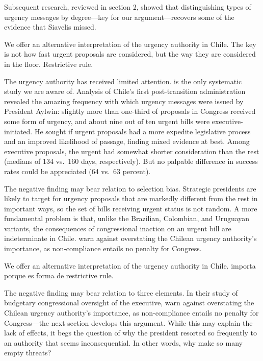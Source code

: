 Subsequent research, reviewed in section 2, showed that distinguishing types of urgency messages by degree---key for our argument---recovers some of the evidence that Siavelis missed. 

We offer an alternative interpretation of the urgency authority in Chile. The key is not how fast urgent proposals are considered, but the way they are considered in the floor. Restrictive rule. 


The urgency authority has received limited attention. \citet{siavelis.2002} is the only systematic study we are aware of. Analysis of Chile's first post-transition administration revealed the amazing frequency with which urgency messages were issued by President Aylwin: slightly more than one-third of proposals in Congress received some form of urgency, and about nine out of ten urgent bills were executive-initiated. He sought if urgent proposals had a more expedite legislative process and an improved likelihood of passage, finding mixed evidence at best. Among executive proposals, the urgent had somewhat shorter consideration than the rest (medians of 134 vs.\ 160 days, respectively). But no palpable difference in success rates could be appreciated (64 vs.\ 63 percent). 

The negative finding may bear relation to selection bias. Strategic presidents are likely to target for urgency proposals that are markedly different from the rest in important ways, so the set of bills receiving urgent status is not random. A more fundamental problem is that, unlike the Brazilian, Colombian, and Uruguayan variants, the consequences of congressional inaction on an urgent bill are indeterminate in Chile. \citet{berrios.gamboa.fiscChile.2006} warn against overstating the Chilean urgency authority's importance, as non-compliance entails no penalty for Congress. 

We offer an alternative interpretation of the urgency authority in Chile. importa porque es forma de restrictive rule. 









The negative finding may bear relation to three elements. In their study of budgetary congressional oversight of the executive, \citet{berrios.gamboa.fiscChile.2006} warn against overstating the Chilean urgency authority's importance, as non-compliance entails no penalty for Congress---the next section develops this argument. While this may explain the lack of effects, it begs the question of why the president resorted so frequently to an authority that seems inconsequential. In other words, why make so many empty threats?



